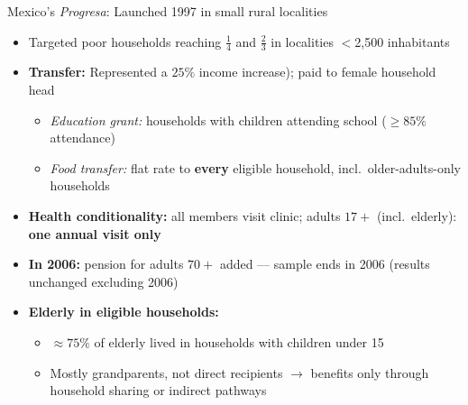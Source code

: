 \documentclass[aspectratio=169,usenames,dvipsnames]{beamer}
\newcommand{\smallcite}[1]{{\footnotesize\textcolor{Blue}{\citep{#1}}}}
\begin{document}
\begin{frame}{Mexico's \textit{Progresa}: Launched 1997 in small rural localities}\label{progresa}
\footnotesize
\begin{itemize}
  \item[$\circ$]  Targeted poor households reaching $\frac{1}{4}$ and $\frac{2}{3}$ in localities $<$2,500 inhabitants
  
  \vspace{1pt}

  \item[$\circ$] \textbf{Transfer:} Represented a $25\%$ income increase); paid to female household head
    \begin{itemize}
      \item \textit{Education grant:} households with children attending school ($\geq 85\%$ attendance)
      \item \textit{Food transfer:} flat rate to \textbf{every} eligible household, incl.\ older-adults-only households
    \end{itemize}
  \vspace{1pt}
  \item[$\circ$] \textbf{Health conditionality:} all members visit clinic; adults $17+$ (incl.\ elderly): \textbf{one annual visit only}
  \vspace{1pt}
  \item[$\circ$] \textbf{In 2006:} pension for adults $70+$ added --- sample ends in 2006 (results unchanged excluding 2006)
  \vspace{1pt}
  \item[$\circ$] \textbf{Elderly in eligible households:}
    \begin{itemize}
      \item $\approx 75\%$ of elderly lived in households with children under 15 \smallcite{BehrmanParker2013Demography}
      \item Mostly grandparents, not direct recipients $\to$ benefits only through household sharing or indirect pathways
    \end{itemize}
\end{itemize}
\end{frame}

\end{document}
